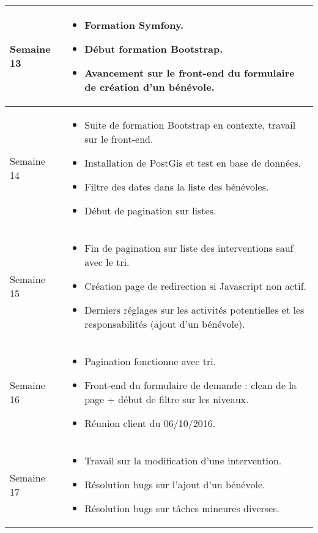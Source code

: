 \documentclass [a4paper] {article}
\begin{document}
\section*{\Francois}

\centering
	\begin{longtable}{|>{\columncolor{gray!40}}p{2cm}|p{12cm}|}
	\hline
	Semaine 13 & \begin{itemize}
	\item Formation Symfony.
	\item Début formation Bootstrap.
	\item Avancement sur le front-end du formulaire de création d'un bénévole.
	\end{itemize}	 \\
	\hline
	
	Semaine 14 & \begin{itemize}
	\item Suite de formation Bootstrap en contexte, travail sur le front-end.
	\item Installation de PostGis et test en base de données.
	\item Filtre des dates dans la liste des bénévoles.
	\item Début de pagination sur listes.
\end{itemize}	 \\
	\hline
	
	Semaine 15 & \begin{itemize}
	\item Fin de pagination sur liste des interventions sauf avec le tri.
	\item Création page de redirection si Javascript non actif.
	\item Derniers réglages sur les activités potentielles et les responsabilités (ajout d'un bénévole).
\end{itemize}	 \\
	\hline
	
	Semaine 16 & \begin{itemize}
	\item Pagination fonctionne avec tri.
	\item Front-end du formulaire de demande : clean de la page + début de filtre sur les niveaux.
	\item Réunion client du 06/10/2016.
\end{itemize}	 \\
	\hline
	
	Semaine 17 & \begin{itemize}
	\item Travail sur la modification d'une intervention.
	\item Résolution bugs sur l'ajout d'un bénévole.
	\item Résolution bugs sur tâches mineures diverses.
\end{itemize}	 \\
	\hline
	

\end{longtable}
\end{document}
